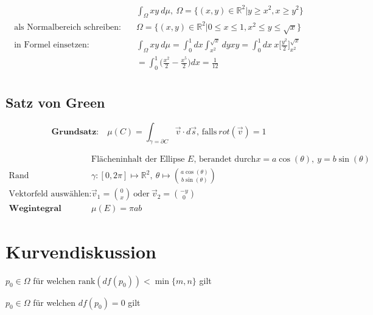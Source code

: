 \documentclass[11pt]{article}
\begin{document}
\begin{equation*}
\begin{split}
	& \int_\Omega xy\ d\mu,\ \Omega = \{(x,y) \in \mathbb{R}^2| y \geq x^2, x \geq y^2 \} \\
	\text{als Normalbereich schreiben:}\quad & \Omega = \{(x,y) \in \mathbb{R}^2| 0 \leq x \leq 1, x^2 \leq y \leq \sqrt{x}\} \\
	\text{in Formel einsetzen:}\quad & \int_\Omega xy\ d\mu = \int_0^1 dx\int_{x^2}^{\sqrt{x}} dyxy = \int_0^1 dx\ x \Big[\frac{y^2}{2}\Big]_{x^2}^{\sqrt{x}} \\
	& = \int_0^1 \Big(\frac{x^2}{2}-\frac{x^5}{2}\Big)dx = \frac{1}{12} \\
\end{split}
\end{equation*}

\subsection{Satz von Green}

\begin{equation*}
	\textbf{Grundsatz:}\quad \mu(C) = \int_{\gamma = \partial C} \vec{v} \cdot d\vec{s}\text{, falls}\ rot(\vec{v}) = 1
\end{equation*}

\begin{equation*}
\begin{split}
	& \text{Fl{\"a}cheninhalt der Ellipse $E$, berandet durch} x = a\cos(\theta),\ y = b\sin(\theta) \\
	\text{Rand parametrisieren:}\quad & \gamma: [0, 2\pi] \mapsto \mathbb{R}^2,\ \theta \mapsto \binom{a\cos(\theta)}{b\sin(\theta)} \\
	\text{Vektorfeld ausw{\"a}hlen:}\quad & \vec{v}_1 = \binom{0}{x}\ \text{oder}\ \vec{v}_2 = \binom{-y}{0} \\
	\textbf{Wegintegral ausrechnen}\quad & \mu(E) = \pi ab
\end{split}
\end{equation*}

\section{Kurvendiskussion}

\begin{description}[labelindent=16pt,style=multiline,leftmargin=6cm, noitemsep]
	\item[kritischer Punkt:] $p_0 \in \Omega$ f{\"u}r welchen $\text{rank}(df(p_0)) < \min\{m,n\}$ gilt
	\item[Kandidaten für Extrema:] $p_0 \in \Omega$ für welchen $df(p_0) = 0$ gilt
\end{description}
\end{document}
